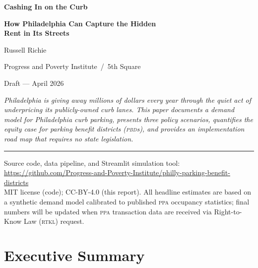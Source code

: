 \documentclass[11pt, letterpaper]{article}
\newcommand{\pbd}{\textsc{pbd}}
\newcommand{\ppa}{\textsc{ppa}}
\newcommand{\rtkl}{\textsc{rtkl}}
\begin{document}
\begin{titlepage}
  \vspace*{2cm}
  {\LARGE\bfseries\color{phillyblue}
   Cashing In on the Curb\par}
  \vspace{0.4em}
  {\Large\bfseries How Philadelphia Can Capture the Hidden\\[0.2em]
   Rent in Its Streets\par}
  \vspace{2em}
  {\large Russell Richie\par}
  \vspace{0.3em}
  {\normalsize Progress and Poverty Institute \,/\, 5th Square\par}
  \vspace{0.5em}
  {\normalsize Draft --- April 2026\par}
  \vfill

  {\small\itshape
   Philadelphia is giving away millions of dollars every year through the quiet
   act of underpricing its publicly-owned curb lanes. This paper documents a
   demand model for Philadelphia curb parking, presents three policy scenarios,
   quantifies the equity case for parking benefit districts (\pbd{}s), and
   provides an implementation road map that requires no state legislation.\par}

  \vspace{1em}
  \noindent\rule{\textwidth}{0.4pt}
  {\footnotesize
   Source code, data pipeline, and Streamlit simulation tool:\\
   \url{https://github.com/Progress-and-Poverty-Institute/philly-parking-benefit-districts}\\[2pt]
   MIT license (code); CC-BY-4.0 (this report). All headline estimates
   are based on a synthetic demand model calibrated to published \ppa{}
   occupancy statistics; final numbers will be updated when \ppa{}
   transaction data are received via Right-to-Know Law (\rtkl) request.\par}
\end{titlepage}

\tableofcontents
\listoffigures
\listoftables
\clearpage

\section*{Executive Summary}
\end{document}
